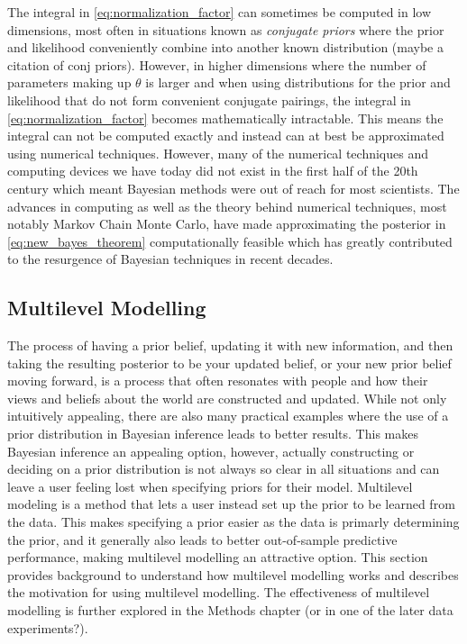 The integral in \ref{eq:normalization_factor} can sometimes be computed in low dimensions, most often in situations known as \textit{conjugate priors} where the prior and likelihood conveniently combine into another known distribution (maybe a citation of conj priors). However, in higher dimensions where the number of parameters making up $\theta$ is larger and when using distributions for the prior and likelihood that do not form convenient conjugate pairings, the integral in \ref{eq:normalization_factor} becomes mathematically intractable. This means the integral can not be computed exactly and instead can at best be approximated using numerical techniques. However, many of the numerical techniques and computing devices we have today did not exist in the first half of the 20th century which meant Bayesian methods were out of reach for most scientists. The advances in computing as well as the theory behind numerical techniques, most notably Markov Chain Monte Carlo, have made approximating the posterior in \ref{eq:new_bayes_theorem} computationally feasible which has greatly contributed to the resurgence of Bayesian techniques in recent decades.

\subsection{Multilevel Modelling} \label{Multilevel_Modelling}

The process of having a prior belief, updating it with new information, and then taking the resulting posterior to be your updated belief, or your new prior belief moving forward, is a process that often resonates with people and how their views and beliefs about the world are constructed and updated. While not only intuitively appealing, there are also many practical examples where the use of a prior distribution in Bayesian inference leads to better results. This makes Bayesian inference an appealing option, however, actually constructing or deciding on a prior distribution is not always so clear in all situations and can leave a user feeling lost when specifying priors for their model. Multilevel modeling is a method that lets a user instead set up the prior to be learned from the data. This makes specifying a prior easier as the data is primarly determining the prior, and it generally also leads to better out-of-sample predictive performance, making multilevel modelling an attractive option. This section provides background to understand how multilevel modelling works and describes the motivation for using multilevel modelling. The effectiveness of multilevel modelling is further explored in the Methods chapter (or in one of the later data experiments?).

